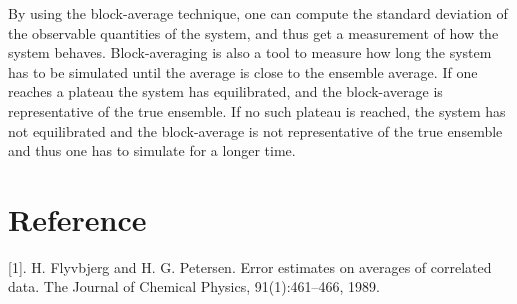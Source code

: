\documentclass[a4paper]{article}
\newcommand{\newparagraph}{\vspace{.5cm}\noindent}
\begin{document}
\newparagraph
By using the block-average technique, one can compute the standard deviation of the observable quantities of the system, and thus get a measurement of how the system behaves.  
Block-averaging is also a tool to measure how long the system has to be simulated until the average is close to the ensemble average.
If one reaches a plateau the system has equilibrated, and the block-average is representative of the true ensemble.
If no such plateau is reached, the system has not equilibrated and the block-average is not representative of the true ensemble and thus one has to simulate for a longer time.

\newpage
\section*{Reference}

[1]. H. Flyvbjerg and H. G. Petersen. Error estimates on averages of correlated
data. The Journal of Chemical Physics, 91(1):461–466, 1989.
\end{document}
